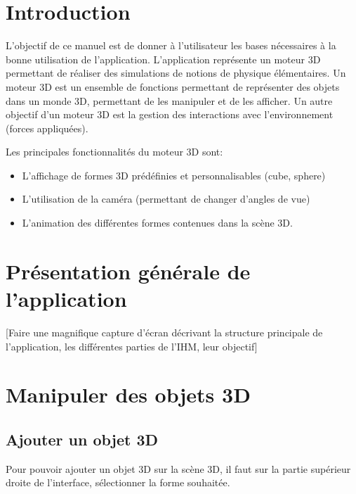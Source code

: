 \documentclass[11pt]{report}
\begin{document}


\tableofcontents

\chapter{Introduction}
L'objectif de ce manuel est de donner à l'utilisateur les bases nécessaires à la bonne utilisation de l'application.
L'application représente un moteur 3D permettant de réaliser des simulations de notions de physique élémentaires.
Un moteur 3D est un ensemble de fonctions permettant de représenter des objets dans un monde 3D, permettant de les
manipuler et de les afficher. Un autre objectif d'un moteur 3D est la gestion des interactions avec l'environnement (forces appliquées). \newline \newline


Les principales fonctionnalités du moteur 3D sont:
\begin{itemize}
        \item L'affichage de formes 3D prédéfinies et personnalisables (cube, sphere)
        \item L'utilisation de la caméra (permettant de changer d'angles de vue)
        \item L'animation des différentes formes contenues dans la scène 3D.
\end{itemize}

\chapter{Présentation générale de l'application}

[Faire une magnifique capture d'écran décrivant la structure principale de l'application, les différentes parties de l'IHM, leur objectif]

\chapter{Manipuler des objets 3D}

\section{Ajouter un objet 3D}
Pour pouvoir ajouter un objet 3D sur la scène 3D, il faut sur la partie supérieur droite de l'interface, sélectionner la forme souhaitée.
\newline

\end{document}
